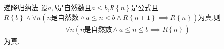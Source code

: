 \begin{corollary}{递降归纳法}{}
	设$a,b$是自然数且$a\leq b$,$R\left\{n\right\}$是公式且$R\left\{b\right\}\wedge\forall n\left(n\text{是自然数}\wedge a\leq n<b\wedge R\left\{n+1\right\}\implies R\left\{n\right\}\right)$为真,则
	\begin{align*}
		\forall n\left(n\text{是自然数}\wedge a\leq n\leq b\implies R\left\{n\right\}\right)
	\end{align*}
	为真.
\end{corollary}






























